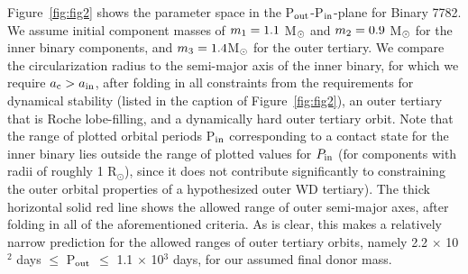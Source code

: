 \documentclass{aastex62}
\begin{document}
Figure~\ref{fig:fig2} shows the parameter space in the P$_{\rm
  out}$-P$_{\rm in}$-plane for Binary 7782.  We assume initial
component masses of $m_{\rm 1} = 1.1$ M$_{\rm \odot}$ and $m_{\rm 2}
= 0.9$ M$_{\rm \odot}$ for the inner binary components, and $m_{\rm 3}
= 1.4 $M$_{\rm \odot}$ for the outer tertiary.  We compare the
circularization radius to the semi-major axis of the inner binary, for
which we require $a_{\rm c} > a_{\rm in}$, after folding in all
constraints from the requirements for dynamical stability (listed in
the caption of Figure~\ref{fig:fig2}), an outer tertiary that is Roche
lobe-filling, and a dynamically hard outer tertiary orbit.  Note that
the range of plotted orbital periods P$_{\rm in}$ corresponding to a
contact state for the inner binary lies outside the range of plotted
values for $P_{\rm in}$ (for components with radii of roughly 1
R$_{\odot}$), since it does not contribute significantly to
constraining the outer orbital properties of a hypothesized outer WD
tertiary).  The thick horizontal solid red line shows the allowed range
of outer semi-major axes, after folding in all of the aforementioned
criteria.  As is clear, this makes a relatively narrow prediction for
the allowed ranges of outer tertiary orbits, namely 2.2 $\times$
10$^{2}$ days $\le$ P$_{\rm out}$ $\le$ 1.1 $\times$ 10$^3$ days, for
our assumed final donor mass.
\end{document}
